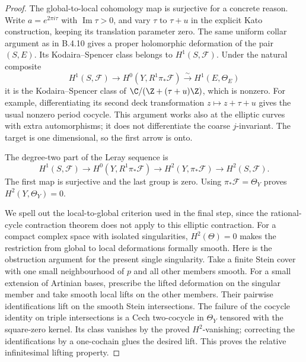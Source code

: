 \begin{proof}
The global-to-local cohomology map is surjective for a concrete
reason.  Write $a=e^{2\pi i\tau}$ with $\operatorname{Im}\tau>0$,
and vary $\tau$ to $\tau+u$ in the explicit Kato construction,
keeping its translation parameter zero.
The same uniform collar argument as in B.4.10 gives a proper
holomorphic deformation of the pair $(S,E)$.
Its Kodaira--Spencer class belongs to $H^1(S,\mathcal F)$.
Under the natural composite
\[
 H^1(S,\mathcal F)\longrightarrow
 H^0(Y,R^1\pi_*\mathcal F)
 \xrightarrow{\ \sim\ }H^1(E,\Theta_E)
\]
it is the Kodaira--Spencer class of
$\C/(\Z+(\tau+u)\Z)$, which is nonzero.
For example, differentiating its second deck transformation
$z\mapsto z+\tau+u$ gives the usual nonzero period cocycle.
This argument works also at the elliptic curves with extra
automorphisms; it does not differentiate the coarse $j$-invariant.
The target is one dimensional, so the first arrow is onto.

The degree-two part of the Leray sequence is
\[
 H^1(S,\mathcal F)\longrightarrow
 H^0(Y,R^1\pi_*\mathcal F)\longrightarrow
 H^2(Y,\pi_*\mathcal F)\longrightarrow H^2(S,\mathcal F).
\]
The first map is surjective and the last group is zero.
Using $\pi_*\mathcal F=\Theta_Y$ proves
$H^2(Y,\Theta_Y)=0$.

We spell out the local-to-global criterion used in the final
step, since the rational-cycle contraction theorem does not
apply to this elliptic contraction.
For a compact complex space with isolated singularities,
$H^2(\Theta)=0$ makes the restriction from global to local
deformations formally smooth.
Here is the obstruction argument for the present single
singularity.  Take a finite Stein cover with one small
neighbourhood of $p$ and all other members smooth.
For a small extension of Artinian bases, prescribe the lifted
deformation on the singular member and take smooth local
lifts on the other members.  Their pairwise identifications
lift on the smooth Stein intersections.  The failure of the
cocycle identity on triple intersections is a Cech two-cocycle
in $\Theta_Y$ tensored with the square-zero kernel.
Its class vanishes by the proved $H^2$-vanishing; correcting
the identifications by a one-cochain glues the desired lift.
This proves the relative infinitesimal lifting property.


\end{proof}
